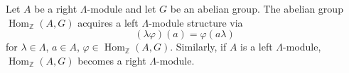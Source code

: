 Let $A$ be a right $\Lambda$-module and let $G$ be an abelian group. The abelian group $\operatorname{Hom}_{\mathbb{Z}}(A, G)$ acquires a left $\Lambda$-module structure via
$$(\lambda \varphi)(a) = \varphi(a\lambda)$$
for $\lambda \in \Lambda$, $a \in A$, $\varphi \in \operatorname{Hom}_{\mathbb{Z}}(A, G)$. Similarly, if $A$ is a left $\Lambda$-module, $\operatorname{Hom}_{\mathbb{Z}}(A, G)$ becomes a right $\Lambda$-module.